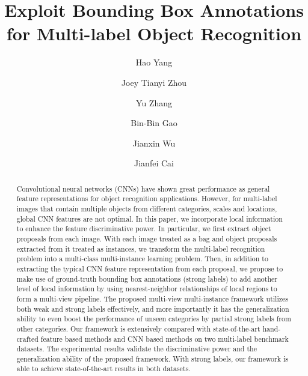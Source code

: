 \documentclass[10pt,twocolumn,letterpaper]{article}
\begin{document}
\title{Exploit Bounding Box Annotations for Multi-label Object Recognition}

\author[1]{Hao Yang}
\author[2]{Joey Tianyi Zhou}
\author[3]{Yu Zhang}
\author[4]{Bin-Bin Gao}
\author[4]{Jianxin Wu}
\author[1]{Jianfei Cai}
\maketitle

\begin{abstract}
 Convolutional neural networks (CNNs) have shown great performance as general feature representations for object recognition applications. However, for multi-label images that contain multiple objects from different categories, scales and locations, global CNN features are not optimal. In this paper, we incorporate local information to enhance the feature discriminative power. In particular, we first extract object proposals from each image. With each image treated as a bag and object proposals extracted from it treated as instances, we transform the multi-label recognition problem into a multi-class multi-instance learning problem. Then, in addition to extracting the typical CNN feature representation from each proposal, we propose to make use of ground-truth bounding box annotations (strong labels) to add another level of local information by using nearest-neighbor relationships of local regions to form a multi-view pipeline. The proposed multi-view multi-instance framework utilizes both weak and strong labels effectively, and more importantly it has the generalization ability to even boost the performance of unseen categories by partial strong labels from other categories. Our framework is extensively compared with state-of-the-art hand-crafted feature based methods and CNN based methods on two multi-label benchmark datasets. The experimental results validate the discriminative power and the generalization ability of the proposed framework. With strong labels, our framework is able to achieve state-of-the-art results in both datasets.
\end{abstract}
\thispagestyle{empty}
\end{document}
